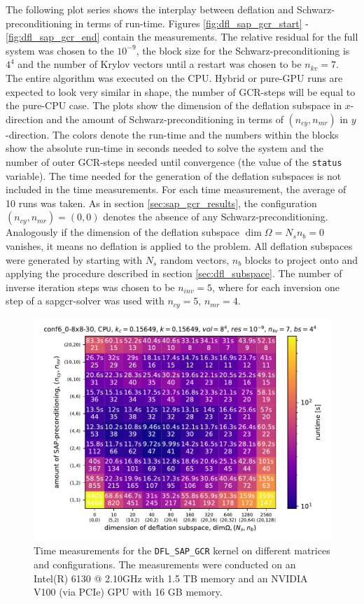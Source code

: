 \documentclass{article}
\theoremstyle{plain} %
\theoremstyle{convention} %
\theoremstyle{remark} %
\def\code#1{\texttt{#1}}
\numberwithin{equation}{section}
\begin{document}
The following plot series shows the interplay between deflation and Schwarz-preconditioning in terms of run-time. Figures \ref{fig:dfl_sap_gcr_start} - \ref{fig:dfl_sap_gcr_end} contain the measurements. The relative residual for the full system was chosen to the $10^{-9}$, the block size for the Schwarz-preconditioning is $4^4$ and the number of Krylov vectors until a restart was chosen to be $n_{kv} = 7$. The entire algorithm was executed on the CPU. Hybrid or pure-GPU runs are expected to look very similar in shape, the number of GCR-steps will be equal to the pure-CPU case. The plots show the dimension of the deflation subspace in $x$-direction and the amount of Schwarz-preconditioning in terms of $(n_{cy},n_{mr})$ in $y$-direction. The colors denote the run-time and the numbers within the blocks show the absolute run-time in seconds needed to solve the system and the number of outer GCR-steps needed until convergence (the value of the \code{status} variable). The time needed for the generation of the deflation subspaces is not included in the time measurements. For each time measurement, the average of \num{10} runs was taken. As in section \ref{sec:sap_gcr_results}, the configuration $(n_{cy},n_{mr}) = (0,0)$ denotes the absence of any Schwarz-preconditioning. Analogously if the dimension of the deflation subspace $\dim \Omega = N_s n_b = 0$ vanishes, it means no deflation is applied to the problem. All deflation subspaces were generated by starting with $N_s$ random vectors, $n_b$ blocks to project onto and applying the procedure described in section \ref{sec:dfl_subspace}. The number of inverse iteration steps was chosen to be $n_{inv} = 5$, where for each inversion one step of a \acrshort*{sapgcr}-solver was used with $n_{cy} = 5$, $n_{mr} = 4$.

\begin{figure}[h]
    \centering
    \includegraphics[width=1.0\textwidth]{plots/dfl_sap_gcr_conf6_0-8x8-30_8x8x8x8_k_0.15649}
    \caption{Time measurements for the \code{DFL\_SAP\_GCR} kernel on different matrices and configurations. The measurements were conducted on an Intel(R) 6130 @ 2.10GHz with 1.5 TB memory and an NVIDIA V100 (via PCIe) GPU with 16 GB memory.}
    \label{fig:dfl_sap_gcr0}
    \label{fig:dfl_sap_gcr_start}
    \label{fig:dfl_sap_gcr_conf6_0-8x8-30_8x8x8x8_k_0.15649}
\end{figure}
\end{document}
